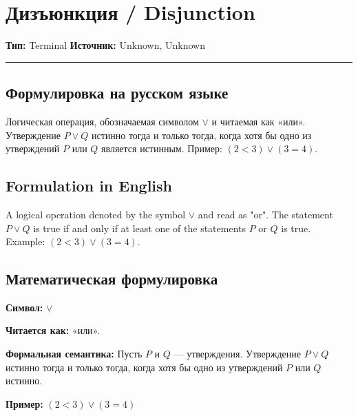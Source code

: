 \documentclass[12pt,a4paper]{report}
\begin{document}

\chapter{Дизъюнкция / Disjunction}\label{entity:term-disjunction}
\textbf{Тип:} Terminal \hfill \textbf{Источник:} Unknown, Unknown

\vspace{0.5em}
\hrule
\vspace{1em}

\section*{Формулировка на русском языке}
Логическая операция, обозначаемая символом $\lor$ и читаемая как «или». Утверждение $P \lor Q$ истинно тогда и только тогда, когда хотя бы одно из утверждений $P$ или $Q$ является истинным. Пример: $(2 < 3) \lor (3 = 4)$.

\section*{Formulation in English}
A logical operation denoted by the symbol $\lor$ and read as "or". The statement $P \lor Q$ is true if and only if at least one of the statements $P$ or $Q$ is true. Example: $(2 < 3) \lor (3 = 4)$.

\section*{Математическая формулировка}
\hypertarget{term-disjunction}{}
\hypertarget{term-disjunction}{}
\begin{object} %

\textbf{Символ:} $\lor$

\textbf{Читается как:} «или».

\textbf{Формальная семантика:}
Пусть $P$ и $Q$ — утверждения. Утверждение $P \lor Q$ истинно тогда и только тогда, когда хотя бы одно из утверждений $P$ или $Q$ истинно.

\textbf{Пример:} $(2 < 3) \lor (3 = 4)$
\end{object}
\end{document}
